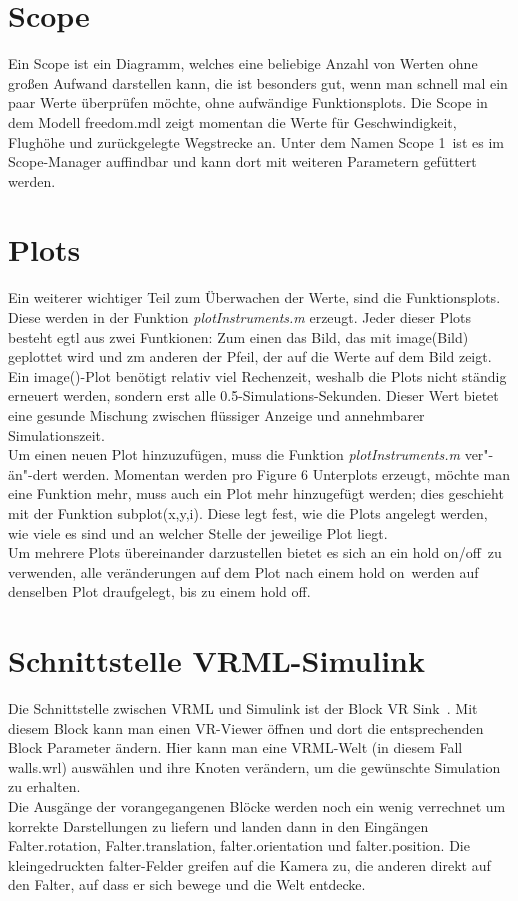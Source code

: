 \documentclass[titlepage, a4paper, ngerman]{article}
\begin{document}
\section{Scope}
\label{scope}
Ein Scope ist ein Diagramm, welches eine beliebige Anzahl von Werten ohne großen Aufwand darstellen kann, die ist besonders gut, wenn man schnell mal ein paar Werte überprüfen möchte, ohne aufwändige Funktionsplots. Die Scope in dem Modell freedom.mdl zeigt momentan die Werte für Geschwindigkeit, Flughöhe und zurückgelegte Wegstrecke an. Unter dem Namen \glqq Scope 1\grqq \ ist es im Scope-Manager auffindbar und kann dort mit weiteren Parametern gefüttert werden.

\section{Plots}
\label{plots}
Ein weiterer wichtiger Teil zum Überwachen der Werte, sind die Funktionsplots. Diese werden in der Funktion {\em plotInstruments.m} erzeugt. Jeder dieser Plots besteht egtl aus zwei Funtkionen: Zum einen das Bild, das mit image(Bild) geplottet wird und zm anderen der Pfeil, der auf die Werte auf dem Bild zeigt.\\
Ein image()-Plot benötigt relativ viel Rechenzeit, weshalb die Plots nicht ständig erneuert werden, sondern erst alle 0.5-Simulations-Sekunden. Dieser Wert bietet eine gesunde Mischung zwischen flüssiger Anzeige und annehmbarer Simulationszeit.\\
Um einen neuen Plot hinzuzufügen, muss die Funktion {\em plotInstruments.m} ver"-än"-dert werden. Momentan werden pro Figure 6 Unterplots erzeugt, möchte man eine Funktion mehr, muss auch ein Plot mehr hinzugefügt werden; dies geschieht mit der Funktion subplot(x,y,i). Diese legt fest, wie die Plots angelegt werden, wie viele es sind und an welcher Stelle der jeweilige Plot liegt.\\
Um mehrere Plots übereinander darzustellen bietet es sich an ein \glqq hold on/off\grqq \ zu verwenden, alle veränderungen auf dem Plot nach einem \glqq hold on\grqq \ werden auf denselben Plot draufgelegt, bis zu einem \glqq hold off\grqq.

\section{Schnittstelle VRML-Simulink}
Die Schnittstelle zwischen VRML und Simulink ist der Block \glqq VR Sink\grqq \ . Mit diesem Block kann man einen VR-Viewer öffnen und dort die entsprechenden Block Parameter ändern. Hier kann man eine VRML-Welt (in diesem Fall walls.wrl) auswählen und ihre Knoten verändern, um die gewünschte Simulation zu erhalten.\\
Die Ausgänge der vorangegangenen Blöcke werden noch ein wenig verrechnet um korrekte Darstellungen zu liefern und landen dann in den Eingängen Falter.rotation, Falter.translation, falter.orientation und falter.position. Die kleingedruckten falter-Felder greifen auf die Kamera zu, die anderen direkt auf den Falter, auf dass er sich bewege und die Welt entdecke.
%
%
\newpage
\end{document}

